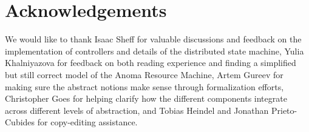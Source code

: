 \section{Acknowledgements}


We would like to thank Isaac Sheff for valuable discussions and feedback on the implementation of controllers and details of the distributed state machine, Yulia Khalniyazova for feedback on both reading experience and finding a simplified but still correct model of the Anoma Resource Machine, Artem Gureev for making sure the abstract notions make sense through formalization efforts, Christopher Goes for helping clarify how the different components integrate across different levels of abstraction, and
Tobias Heindel and Jonathan Prieto-Cubides for copy-editing assistance.